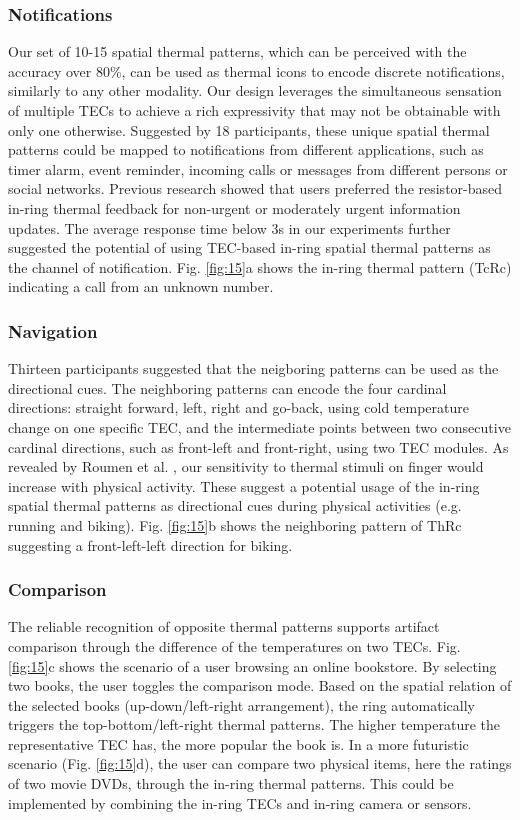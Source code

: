 \documentclass[preprint,12pt]{elsarticle}
\begin{document}
\subsubsection{Notifications}
Our set of 10-15 spatial thermal patterns, which can be perceived with the accuracy over 80\%, can be used as thermal icons to encode discrete notifications, similarly to any other modality. Our design leverages the simultaneous sensation of multiple TECs to achieve a rich expressivity that may not be obtainable with only one otherwise. Suggested by 18 participants, these unique spatial thermal patterns could be mapped to notifications from different applications, such as timer alarm, event reminder, incoming calls or messages from different persons or social networks. Previous research \cite{24} showed that users preferred the resistor-based in-ring thermal feedback for non-urgent or moderately urgent information updates. The average response time below 3s in our experiments further suggested the potential of using TEC-based in-ring spatial thermal patterns as the channel of notification. Fig. \ref{fig:15}a shows the in-ring thermal pattern (TcRc) indicating a call from an unknown number.

\subsubsection{Navigation}
Thirteen participants suggested that the neigboring patterns can be used as the directional cues. The neighboring patterns can encode the four cardinal directions: straight forward, left, right and go-back, using cold temperature change on one specific TEC, and the intermediate points between two consecutive cardinal directions, such as front-left and front-right, using two TEC modules. As revealed by Roumen et al. \cite{24}, our sensitivity to thermal stimuli on finger would increase with physical activity. These suggest a potential usage of the in-ring spatial thermal patterns as directional cues during physical activities (e.g. running and biking). Fig. \ref{fig:15}b shows the neighboring pattern of ThRc suggesting a front-left-left direction for biking.

\subsubsection{Comparison}
The reliable recognition of opposite thermal patterns supports artifact comparison through the difference of the temperatures on two TECs. Fig. \ref{fig:15}c shows the scenario of a user browsing an online bookstore. By selecting two books, the user toggles the comparison mode. Based on the spatial relation of the selected books (up-down/left-right arrangement), the ring automatically triggers the top-bottom/left-right thermal patterns. The higher temperature the representative TEC has, the more popular the book is. In a more futuristic scenario (Fig. \ref{fig:15}d), the user can compare two physical items, here the ratings of two movie DVDs, through the in-ring thermal patterns. This could be implemented by combining the in-ring TECs and in-ring camera or sensors.
\end{document}
